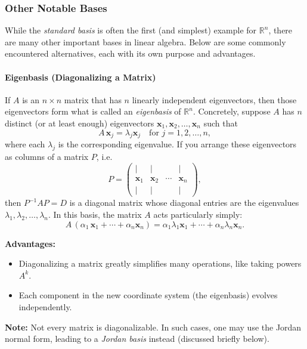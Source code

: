 \subsubsection{Other Notable Bases}

While the \emph{standard basis} is often the first (and simplest) example for $\mathbb{R}^n$, there are many other important bases in linear algebra. Below are some commonly encountered alternatives, each with its own purpose and advantages.

\paragraph{Eigenbasis (Diagonalizing a Matrix)}

\noindent
If $A$ is an $n \times n$ matrix that has $n$ linearly independent eigenvectors, 
then those eigenvectors form what is called an \emph{eigenbasis} of $\mathbb{R}^n$. 
Concretely, suppose $A$ has $n$ distinct (or at least enough) eigenvectors 
\(\mathbf{x}_1, \mathbf{x}_2, \dots, \mathbf{x}_n\) such that 
\[
  A\,\mathbf{x}_j = \lambda_j \mathbf{x}_j \quad \text{for } j=1,2,\dots,n,
\]
where each $\lambda_j$ is the corresponding eigenvalue. If you arrange these eigenvectors 
as columns of a matrix $P$, i.e.\ 
\[
  P = \begin{pmatrix}
  | & | &        & | \\
  \mathbf{x}_1 & \mathbf{x}_2 & \cdots & \mathbf{x}_n \\
  | & | &        & | 
  \end{pmatrix},
\]
then $P^{-1} A P = D$ is a diagonal matrix whose diagonal entries are the eigenvalues 
\(\lambda_1, \lambda_2, \dots, \lambda_n\). In this basis, the matrix $A$ acts particularly simply:
\[
  A\,(\alpha_1\,\mathbf{x}_1 + \cdots + \alpha_n \mathbf{x}_n)
  = \alpha_1 \lambda_1 \mathbf{x}_1 + \cdots + \alpha_n \lambda_n \mathbf{x}_n.
\]

\noindent
\textbf{Advantages:} 
\begin{itemize}
\item Diagonalizing a matrix greatly simplifies many operations, like taking powers $A^k$.
\item Each component in the new coordinate system (the eigenbasis) evolves independently.
\end{itemize}

\noindent
\textbf{Note:} 
Not every matrix is diagonalizable. In such cases, one may use the Jordan normal form, 
leading to a \emph{Jordan basis} instead (discussed briefly below).

